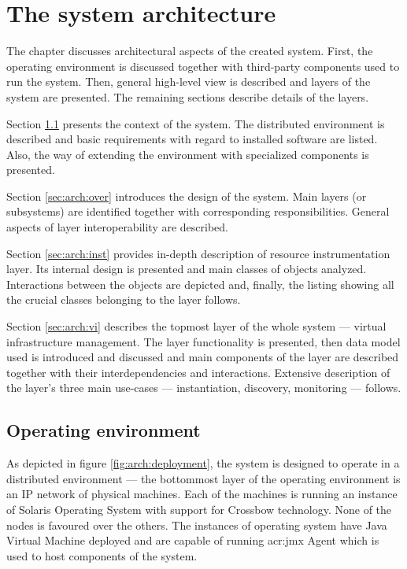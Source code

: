 \documentclass[11pt]{book}
\begin{document}
  \chapter{The system architecture}
  \label{chap:arch}

    The chapter discusses architectural aspects of the created system. First, the operating environment is discussed
    together with third-party components used to run the system. Then, general high-level view is described and
    layers of the system are presented. The remaining sections describe details of the layers.

    Section \ref{sec:arch:env} presents the context of the system. The distributed environment is described and
    basic requirements with regard to installed software are listed. Also, the way of extending the environment with
    specialized components is presented.

    Section \ref{sec:arch:over} introduces the design of the system. Main layers (or subsystems) are identified together
    with corresponding responsibilities. General aspects of layer interoperability are described.

    Section \ref{sec:arch:inst} provides in-depth description of resource instrumentation layer. Its internal design is
    presented and main classes of objects analyzed. Interactions between the objects are depicted and, finally, the
    listing showing all the crucial classes belonging to the layer follows.

    Section \ref{sec:arch:vi} describes the topmost layer of the whole system --- virtual infrastructure management. The
    layer functionality is presented, then data model used is introduced and discussed and main components of the layer
    are described together with their interdependencies and interactions. Extensive description of the layer's three
    main use-cases --- instantiation, discovery, monitoring --- follows.


    \section{Operating environment}
    \label{sec:arch:env}

      As depicted in figure \ref{fig:arch:deployment}, the system is designed to operate in a distributed environment
      --- the bottommost layer of the operating environment is an IP network of physical machines. Each of the machines
      is running an instance of Solaris Operating System with support for Crossbow technology. None of the nodes is
      favoured over the others. The instances of operating system have Java Virtual Machine deployed and are capable of
      running \gls{acr:jmx} Agent which is used to host components of the system.
\end{document}
